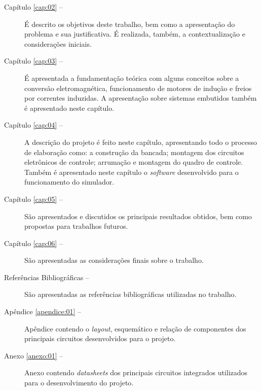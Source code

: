\begin{description}
	\item[Capítulo \ref{cap:02} --] É descrito os objetivos deste trabalho, bem como a apresentação do problema e sua justificativa. É realizada, também, a contextualização e considerações iniciais.
	
	\item[Capítulo \ref{cap:03} --] É apresentada a fundamentação teórica com alguns conceitos sobre a conversão eletromagnética, funcionamento de motores de indução e freios por correntes induzidas. A apresentação sobre sistemas embutidos também é apresentado neste capítulo.
	
	\item[Capítulo \ref{cap:04} --] A descrição do projeto é feito neste capítulo, apresentando todo o processo de elaboração como: a construção da bancada; montagem dos circuitos eletrônicos de controle; arrumação e montagem do quadro de controle. Também é apresentado neste capítulo o \textit{software} desenvolvido para o funcionamento do simulador.
	
	\item[Capítulo \ref{cap:05} --] São apresentados e discutidos os principais resultados obtidos, bem como propostas para trabalhos futuros.
	
	\item[Capítulo \ref{cap:06} --]  São apresentadas as considerações finais sobre o trabalho.
	
	\item[Referências Bibliográficas --] São apresentadas as referências bibliográficas utilizadas no trabalho.
	
	\item[Apêndice \ref{apendice:01} --] Apêndice contendo o \textit{layout}, esquemático e relação de componentes dos principais circuitos desenvolvidos para o projeto.
	
	\item[Anexo \ref{anexo:01} --] Anexo contendo \textit{datasheets} dos principais circuitos integrados utilizados para o desenvolvimento do projeto.
	
\end{description}

